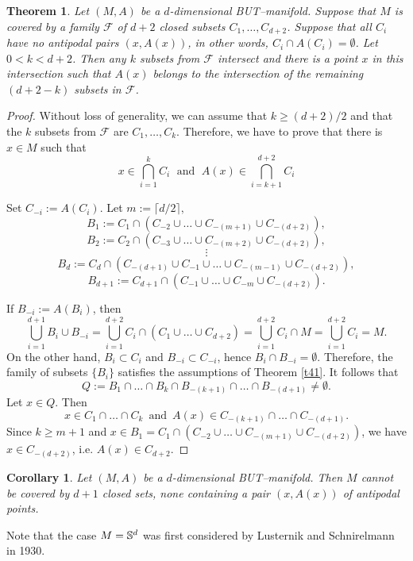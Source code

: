 \documentclass[a4paper,12pt]{article}
\newtheorem{theorem}{Theorem}[section]
\newtheorem{cor}{Corollary}[section]
\begin{document}
\begin{theorem} \label{t42} Let $(M,A)$ be a $d$-dimensional BUT--manifold. Suppose that $M$ is covered by a family $\mathcal F$ of $d+2$ closed subsets $C_1,\ldots,C_{d+2}$. Suppose that all $C_i$ have no antipodal pairs $(x,A(x))$, in other words, $C_i\cap A(C_i)=\emptyset$. Let $0<k<d+2$. Then  any $k$ subsets from $\mathcal F$ intersect and there is a point $x$ in this intersection such that $A(x)$ belongs to the intersection of the remaining $(d+2-k)$ subsets in $\mathcal F$.
\end{theorem}
\begin{proof} Without loss of generality, we can assume that $k\ge(d+2)/2$ and that the $k$ subsets from $\mathcal F$ are $C_1,\ldots,C_k$. Therefore, we have to prove that there is $x\in M$ such that
	$$
	x\in \bigcap\limits_{i=1}^k{C_i} \; \mbox{ and } \; A(x)\in \bigcap\limits_{i=k+1}^{d+2}{C_i}
	$$
	
Set $C_{-i}:=A(C_i)$. Let $m:=\lceil{d/2}\rceil,$
$$
B_1:=C_1\cap(C_{-2}\cup\ldots\cup C_{-(m+1)}\cup C_{-(d+2)}),
$$
$$
B_2:=C_2\cap(C_{-3}\cup\ldots\cup C_{-(m+2)}\cup C_{-(d+2)}),
$$
$$
\vdots
$$
$$
B_d:=C_d\cap(C_{-(d+1)}\cup C_{-1}\cup\ldots\cup C_{-(m-1)}\cup  C_{-(d+2)}),
$$
$$
B_{d+1}:=C_{d+1}\cap(C_{-1}\cup\ldots\cup C_{-m}\cup C_{-(d+2)}).
$$

If $B_{-i}:=A(B_i)$, then
$$
\bigcup\limits_{i=1}^{d+1}{B_i\cup B_{-i}}=\bigcup\limits_{i=1}^{d+2}{C_i\cap(C_1\cup\ldots\cup C_{d+2})}=\bigcup\limits_{i=1}^{d+2}{C_i\cap M}=\bigcup\limits_{i=1}^{d+2}{C_i}=M.
$$
On the other hand, $B_i\subset C_i$ and $B_{-i}\subset C_{-i}$, hence $B_i\cap B_{-i}=\emptyset$. Therefore, the family of subsets $\{B_i\}$ satisfies the assumptions of Theorem \ref{t41}. It follows that
$$
Q:=B_1\cap\ldots\cap B_k\cap B_{-(k+1)}\cap\ldots\cap B_{-(d+1)}\ne\emptyset.
$$
Let $x\in Q$. Then $$x\in C_1\cap\ldots\cap C_k \, \mbox{ and } \, A(x)\in C_{-(k+1)}\cap\ldots\cap C_{-(d+1)}.$$
Since $k\ge m+1$ and $x\in B_1=C_1\cap(C_{-2}\cup\ldots\cup C_{-(m+1)}\cup C_{-(d+2)})$, we have $x\in C_{-(d+2)}$, i.e. $A(x)\in C_{d+2}$.
\end{proof}

\begin{cor} Let $(M,A)$ be a $d$-dimensional BUT--manifold. Then $M$ cannot
be covered by $d+1$ closed sets, none containing a pair $(x,A(x))$ of antipodal points.
\end{cor}

Note that the case $M={\Bbb S}^d$ was first considered by Lusternik and Schnirelmann in 1930.
\end{document}
